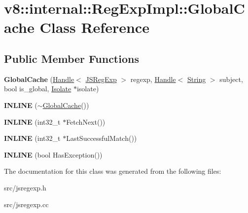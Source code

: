 \hypertarget{classv8_1_1internal_1_1_reg_exp_impl_1_1_global_cache}{}\section{v8\+:\+:internal\+:\+:Reg\+Exp\+Impl\+:\+:Global\+Cache Class Reference}
\label{classv8_1_1internal_1_1_reg_exp_impl_1_1_global_cache}
\subsection*{Public Member Functions}
\begin{DoxyCompactItemize}
\item 
\hypertarget{classv8_1_1internal_1_1_reg_exp_impl_1_1_global_cache_a8f4db37aea20d799bb2386e2271e7922}{}{\bfseries Global\+Cache} (\hyperlink{classv8_1_1internal_1_1_handle}{Handle}$<$ \hyperlink{classv8_1_1internal_1_1_j_s_reg_exp}{J\+S\+Reg\+Exp} $>$ regexp, \hyperlink{classv8_1_1internal_1_1_handle}{Handle}$<$ \hyperlink{classv8_1_1internal_1_1_string}{String} $>$ subject, bool is\+\_\+global, \hyperlink{classv8_1_1internal_1_1_isolate}{Isolate} $\ast$isolate)\label{classv8_1_1internal_1_1_reg_exp_impl_1_1_global_cache_a8f4db37aea20d799bb2386e2271e7922}

\item 
\hypertarget{classv8_1_1internal_1_1_reg_exp_impl_1_1_global_cache_a7d66100b3be114742bdfe955c6e4f861}{}{\bfseries I\+N\+L\+I\+N\+E} ($\sim$\hyperlink{classv8_1_1internal_1_1_reg_exp_impl_1_1_global_cache}{Global\+Cache}())\label{classv8_1_1internal_1_1_reg_exp_impl_1_1_global_cache_a7d66100b3be114742bdfe955c6e4f861}

\item 
\hypertarget{classv8_1_1internal_1_1_reg_exp_impl_1_1_global_cache_a1b2facfe08b530e688d947045cb41c31}{}{\bfseries I\+N\+L\+I\+N\+E} (int32\+\_\+t $\ast$Fetch\+Next())\label{classv8_1_1internal_1_1_reg_exp_impl_1_1_global_cache_a1b2facfe08b530e688d947045cb41c31}

\item 
\hypertarget{classv8_1_1internal_1_1_reg_exp_impl_1_1_global_cache_a70396bcf345974efd7d64a84f501d5dc}{}{\bfseries I\+N\+L\+I\+N\+E} (int32\+\_\+t $\ast$Last\+Successful\+Match())\label{classv8_1_1internal_1_1_reg_exp_impl_1_1_global_cache_a70396bcf345974efd7d64a84f501d5dc}

\item 
\hypertarget{classv8_1_1internal_1_1_reg_exp_impl_1_1_global_cache_a3039a1845cc2c971c770591de083f7d3}{}{\bfseries I\+N\+L\+I\+N\+E} (bool Has\+Exception())\label{classv8_1_1internal_1_1_reg_exp_impl_1_1_global_cache_a3039a1845cc2c971c770591de083f7d3}

\end{DoxyCompactItemize}


The documentation for this class was generated from the following files\+:\begin{DoxyCompactItemize}
\item 
src/jsregexp.\+h\item 
src/jsregexp.\+cc\end{DoxyCompactItemize}
